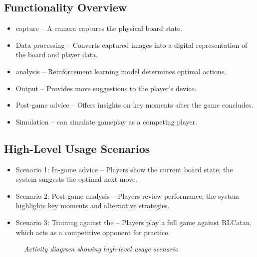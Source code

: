 \documentclass{article}
\begin{document}
\subsection{Functionality Overview}\label{subsec:functionality-overview}
\begin{itemize}
    \item {\GameState{} capture} – A camera captures the physical board state.
    \item {Data processing} – Converts captured images into a digital representation of the board and player data.
    \item {\AI{} analysis} – Reinforcement learning model determines optimal actions.
    \item {Output} – Provides move suggestions to the player's device.
    \item {Post-game advice} – Offers insights on key moments after the game concludes.
    \item {Simulation} – \AI{} can simulate gameplay as a competing player.
\end{itemize}

\subsection{High-Level Usage Scenarios}\label{subsec:high-level-usage-scenarios}
\begin{itemize}
    \item {Scenario 1: In-game advice} – Players show the current board state; the system suggests the optimal next move.
    \item {Scenario 2: Post-game analysis} – Players review performance; the system highlights key moments and alternative strategies.
    \item {Scenario 3: Training against the \AI{}} – Players play a full game against RLCatan, which acts as a competitive opponent for practice.
\end{itemize}
\begin{figure}[H]
    \caption{\textit{Activity diagram showing high-level usage scenario}}
    \label{fig:activity-diagram}
\end{figure}
\end{document}
